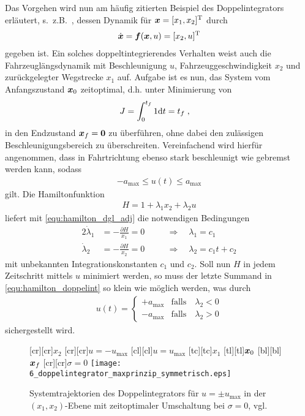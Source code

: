 Das Vorgehen wird nun am häufig zitierten Beispiel des Doppelintegrators erläutert, s.\ z.B.\ \cite{papageorgiou2012optimierung, graichen2014SkriptOpt}, dessen Dynamik für $\boldsymbol{x} = [x_1, x_2]^{{\rm T}}$ durch
\begin{align*}
	\dot{\boldsymbol{x}} = \boldsymbol{f}(\boldsymbol{x}, u) = [x_2, u ]^{{\rm T}}
\end{align*}
gegeben ist. Ein solches doppeltintegrierendes Verhalten weist auch die Fahrzeuglängsdynamik mit Beschleunigung $u$, Fahrzeuggeschwindigkeit $x_2$ und zurückgelegter Wegstrecke $x_1$ auf. Aufgabe ist es nun, das System
vom Anfangszustand $\boldsymbol{x}_0$ zeitoptimal, d.h. unter Minimierung von 
\begin{align*}
	J &= \int_{0}^{t_f} 1 {\rm d} t = t_f \;,
\end{align*}
in den Endzustand $\boldsymbol{x}_f = \boldsymbol{0}$ zu überführen, ohne dabei den zulässigen Beschleunigungsbereich zu überschreiten. Vereinfachend wird hierfür angenommen, dass in Fahrtrichtung ebenso stark beschleunigt wie gebremst werden kann, sodass
\begin{align*}
	-a_{\max} \leq u(t) \leq a_{\max}
\end{align*}
gilt. Die Hamiltonfunktion
\begin{align} \label{equ:hamilton_doppelint}
	H = 1 + \lambda_1 x_2 + \lambda_2 u
\end{align}
liefert mit \eqref{equ:hamilton_dgl_adj} die notwendigen Bedingungen
\begin{alignat}{2}
	\dot \lambda_1 &= -\frac{\partial H}{x_1} = 0 \quad & &\Rightarrow \quad \lambda_1 = c_1 \nonumber\\
	\dot \lambda_2 &= -\frac{\partial H}{x_2} = 0 \quad & &\Rightarrow \quad \lambda_2 = c_1 t + c_2 \label{equ:doppelint_lambda_2}
\end{alignat}
mit unbekannten Integrationskonstanten $c_1$ und $c_2$. Soll nun $H$ in jedem Zeitschritt mittels $u$ minimiert werden, so muss der letzte Summand in \eqref{equ:hamilton_doppelint} so klein wie möglich werden, was durch 
\begin{align} \label{equ:doppelint_u}
u(t)=\begin{cases} + a_{\max} & \text{falls} \quad \lambda_2 < 0 \\ 
                   - a_{\max} & \text{falls} \quad \lambda_2 > 0 \end{cases}
\end{align}
sichergestellt wird. 
\begin{figure}[t]
\centering
	[cr][cr]{$x_2$}
	[cr][cr]{$u= -u_{\max}$}
	[cl][cl]{$u= u_{\max}$}
	[tc][tc]{$x_1$}
	[tl][tl]{$\boldsymbol{x}_0$}
	[bl][bl]{$\boldsymbol{x}_f$}
	[cr][cr]{$\sigma = 0$}
	\centering
  	\texttt{[image: 6\_doppelintegrator\_maxprinzip\_symmetrisch.eps]}
  \caption[Systemtrajektorien des Doppelintegrators]{Systemtrajektorien des Doppelintegrators für $u = \pm u_{\max}$ in der $(x_1,x_2)$-Ebene mit zeitoptimaler Umschaltung bei $\sigma=0$, vgl.\ \cite{graichen2014SkriptOpt, papageorgiou2012optimierung}}
    \label{fig:doppelintegrator_maxprinzip}
\end{figure}
